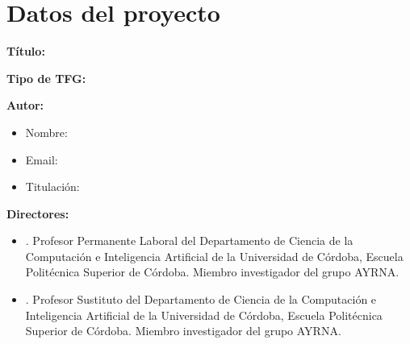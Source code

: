 \section{Datos del proyecto}
\label{sec:datos_proyecto}

\noindent\textbf{Título:} \TituloTFG

\vspace{1em} %

\noindent\textbf{Tipo de TFG:} \TipoTFG

\vspace{1em} %

\noindent\textbf{Autor:}
\begin{itemize}
    \itemsep0.25em %
    \item Nombre: \AutorTFG
    \item Email: \texttt{\EmailTFG}
    \item Titulación: \TitulacionTFG
\end{itemize}

\vspace{0.5em} %

\noindent\textbf{Directores:}
\begin{itemize}
    \itemsep0.25em %
    \item \DirectorUno. Profesor Permanente Laboral del Departamento de Ciencia de la Computación e Inteligencia Artificial de la Universidad de Córdoba, Escuela Politécnica Superior de Córdoba. Miembro investigador del grupo AYRNA.
    \item \DirectorDos. Profesor Sustituto del Departamento de Ciencia de la Computación e Inteligencia Artificial de la Universidad de Córdoba, Escuela Politécnica Superior de Córdoba. Miembro investigador del grupo AYRNA.
\end{itemize}